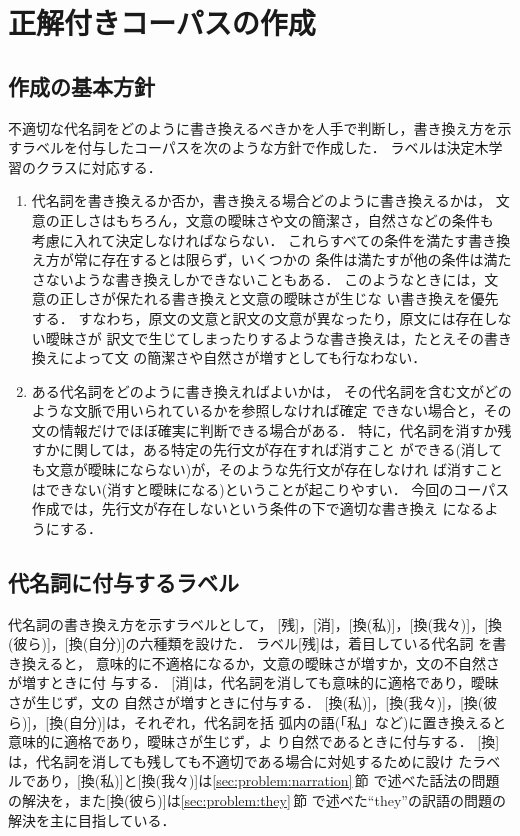 \section{正解付きコーパスの作成}
\label{sec:corpus}

\subsection{作成の基本方針}
\label{sec:corpus:policy}

不適切な代名詞をどのように書き換えるべきかを人手で判断し，書き換え方を示
すラベルを付与したコーパスを次のような方針で作成した．
ラベルは決定木学習のクラスに対応する．
\begin{enumerate}
\item
代名詞を書き換えるか否か，書き換える場合どのように書き換えるかは，
文意の正しさはもちろん，文意の曖昧さや文の簡潔さ，自然さなどの条件も
考慮に入れて決定しなければならない．
これらすべての条件を満たす書き換え方が常に存在するとは限らず，いくつかの
条件は満たすが他の条件は満たさないような書き換えしかできないこともある．
このようなときには，文意の正しさが保たれる書き換えと文意の曖昧さが生じな
い書き換えを優先する．
すなわち，原文の文意と訳文の文意が異なったり，原文には存在しない曖昧さが
訳文で生じてしまったりするような書き換えは，たとえその書き換えによって文
の簡潔さや自然さが増すとしても行なわない．
\item 
ある代名詞をどのように書き換えればよいかは，
その代名詞を含む文がどのような文脈で用いられているかを参照しなければ確定
できない場合と，その文の情報だけでほぼ確実に判断できる場合がある．
特に，代名詞を消すか残すかに関しては，ある特定の先行文が存在すれば消すこと
ができる(消しても文意が曖昧にならない)が，そのような先行文が存在しなけれ
ば消すことはできない(消すと曖昧になる)ということが起こりやすい．
今回のコーパス作成では，先行文が存在しないという条件の下で適切な書き換え
になるようにする．
\end{enumerate}

\subsection{代名詞に付与するラベル}
\label{sec:corpus:label}

代名詞の書き換え方を示すラベルとして，
[残]，[消]，[換(私)]，[換(我々)]，[換(彼ら)]，[換(自分)]の六種類を設けた．
ラベル[残]は，着目している代名詞
を書き換えると，
意味的に不適格になるか，文意の曖昧さが増すか，文の不自然さが増すときに付
与する．
[消]は，代名詞を消しても意味的に適格であり，曖昧さが生じず，文の
自然さが増すときに付与する．
[換(私)]，[換(我々)]，[換(彼ら)]，[換(自分)]は，それぞれ，代名詞を括
弧内の語(「私」など)に置き換えると意味的に適格であり，曖昧さが生じず，よ
り自然であるときに付与する．
[換]は，代名詞を消しても残しても不適切である場合に対処するために設け
たラベルであり，[換(私)]と[換(我々)]は\ref{sec:problem:narration}\,節
で述べた話法の問題の解決を，また[換(彼ら)]は\ref{sec:problem:they}\,節
で述べた``they''の訳語の問題の解決を主に目指している．

